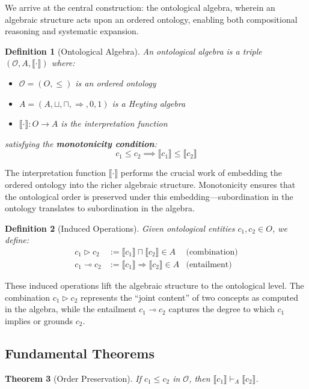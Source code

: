 \documentclass[11pt,a4paper]{article}
\newtheorem{definition}{Definition}[section]
\newtheorem{theorem}[definition]{Theorem}
\newcommand{\onto}{\mathcal{O}}
\newcommand{\sem}[1]{\llbracket #1 \rrbracket}
\begin{document}
We arrive at the central construction: the ontological algebra, wherein an algebraic structure acts upon an ordered ontology, enabling both compositional reasoning and systematic expansion.

\begin{definition}[Ontological Algebra]
An \emph{ontological algebra} is a triple $(\onto, A, \sem{\cdot})$ where:
\begin{itemize}
    \item $\onto = (O, \leq)$ is an ordered ontology
    \item $A = (A, \sqcup, \sqcap, \Rightarrow, 0, 1)$ is a Heyting algebra
    \item $\sem{\cdot} : O \to A$ is the \emph{interpretation function}
\end{itemize}
satisfying the \textbf{monotonicity condition}:
$$
c_1 \leq c_2 \implies \sem{c_1} \leq \sem{c_2}
$$
\end{definition}

The interpretation function $\sem{\cdot}$ performs the crucial work of embedding the ordered ontology into the richer algebraic structure. Monotonicity ensures that the ontological order is preserved under this embedding---subordination in the ontology translates to subordination in the algebra.

\begin{definition}[Induced Operations]
Given ontological entities $c_1, c_2 \in O$, we define:
\begin{align*}
    c_1 \triangleright c_2 &:= \sem{c_1} \sqcap \sem{c_2} \in A & \text{(combination)}\\
    c_1 \multimap c_2 &:= \sem{c_1} \Rightarrow \sem{c_2} \in A & \text{(entailment)}
\end{align*}
\end{definition}

These induced operations lift the algebraic structure to the ontological level. The combination $c_1 \triangleright c_2$ represents the ``joint content'' of two concepts as computed in the algebra, while the entailment $c_1 \multimap c_2$ captures the degree to which $c_1$ implies or grounds $c_2$.

\subsection{Fundamental Theorems}

\begin{theorem}[Order Preservation]
If $c_1 \leq c_2$ in $\onto$, then $\sem{c_1} \vdash_A \sem{c_2}$.
\end{theorem}
\end{document}
